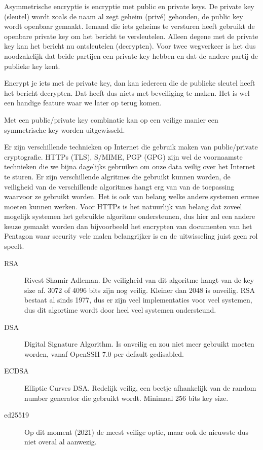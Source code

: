 Asymmetrische encryptie is encryptie met public en private keys. De private key (sleutel) wordt zoals de naam al zegt geheim (priv\'e) gehouden, de public key wordt openbaar gemaakt. Iemand die iets geheims te versturen heeft gebruikt de openbare private key om het bericht te versleutelen. Alleen degene met de private key kan het bericht nu ontsleutelen (decrypten). Voor twee wegverkeer is het dus noodzakelijk dat beide partijen een private key hebben en dat de andere partij de publieke key kent.

Encrypt je iets met de private key, dan kan iedereen die de publieke sleutel heeft het bericht decrypten. Dat heeft dus niets met beveiliging te maken. Het is wel een handige feature waar we later op terug komen.

Met een public/private key combinatie kan op een veilige manier een symmetrische key worden uitgewisseld.

Er zijn verschillende technieken op Internet die gebruik maken van public/private cryptografie. HTTPs (TLS), S/MIME, PGP (GPG) zijn wel de voornaamste technieken die we bijna dagelijks gebruiken om onze data veilig over het Internet te sturen. Er zijn verschillende algritmes die gebruikt kunnen worden, de veiligheid van de verschillende algoritmes hangt erg van van de toepassing waarvoor ze gebruikt worden. Het is ook van belang welke andere systemen ermee moeten kunnen werken. Voor HTTPs is het natuurlijk van belang dat zoveel mogelijk systemen het gebruikte algoritme ondersteunen, dus hier zal een andere keuze gemaakt worden dan bijvoorbeeld het encrypten van documenten van het Pentagon waar security vele malen belangrijker is en de uitwisseling juist geen rol speelt.

\begin{description}
\item[RSA] Rivest-Shamir-Adleman. De veiligheid van dit algoritme hangt van de key size af. 3072 of 4096 bits zijn nog veilig. Kleiner dan 2048 is onveilig. RSA bestaat al sinds 1977, dus er zijn veel implementaties voor veel systemen, dus dit algortime wordt door heel veel systemen ondersteund.
\item[DSA] Digital Signature Algorithm. Is onveilig en zou niet meer gebruikt moeten worden, vanaf OpenSSH 7.0 per default gedisabled.
\item[ECDSA] Elliptic Curves DSA. Redelijk veilig, een beetje afhankelijk van de random number generator die gebruikt wordt. Minimaal 256 bits key size.
\item[ed25519] Op dit moment (2021) de meest veilige optie, maar ook de nieuwste dus niet overal al aanwezig.
\end{description}

